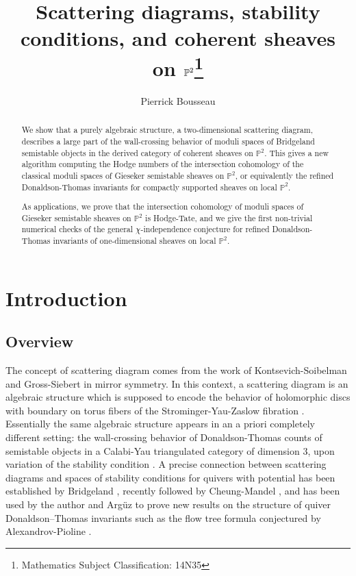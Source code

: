 \documentclass[12pt, a4paper]{amsart}
\title[Scattering diagrams, stability conditions, and coherent sheaves on 
$\PP^2$]{Scattering diagrams, stability conditions, and coherent sheaves on 
$\PP^2$\footnote{Mathematics Subject Classification: 14N35}}
\author{Pierrick Bousseau}
\date{}
\newcommand\PP{\mathbb P}
\begin{document}
\begin{abstract}
We show that a purely algebraic structure, a two-dimensional scattering diagram, describes a large part of the wall-crossing behavior of moduli spaces of Bridgeland semistable objects in the derived category of coherent sheaves on $\PP^2$. This gives a new algorithm computing the Hodge numbers of the intersection cohomology of the classical moduli spaces of Gieseker semistable sheaves
on $\PP^2$, or equivalently the refined Donaldson-Thomas invariants for compactly supported sheaves on local 
$\PP^2$.

As applications, we prove that the intersection cohomology of moduli spaces of Gieseker semistable sheaves on $\PP^2$ is Hodge-Tate, and we give the first non-trivial numerical checks of the general $\chi$-independence conjecture for refined Donaldson-Thomas invariants of one-dimensional sheaves on local $\PP^2$.
\end{abstract}



\maketitle

\setcounter{tocdepth}{1}
\setcounter{section}{-1}

\tableofcontents

\thispagestyle{empty}







\section{Introduction}

\subsection{Overview}

The concept of scattering diagram comes from the work of 
Kontsevich-Soibelman \cite{MR2181810}
and Gross-Siebert \cite{MR2846484} in mirror symmetry. In this context, a scattering diagram is an algebraic structure which is supposed to encode the behavior of holomorphic discs with boundary
on torus fibers of the Strominger-Yau-Zaslow fibration \cite{MR1429831}. Essentially the same algebraic structure appears in an a priori completely different setting: the wall-crossing behavior of Donaldson-Thomas counts of semistable objects in a Calabi-Yau triangulated category of dimension $3$, upon variation of the stability condition \cite{kontsevich2008stability, MR2951762, MR3330788}.
A precise connection between scattering diagrams and spaces of stability conditions
for quivers with potential has been established by Bridgeland \cite{MR3710055}, recently followed by Cheung-Mandel \cite{cheung2019donaldson}, and has been used by the author and Arg\"uz \cite{AB21} to prove new results on the structure of quiver Donaldson--Thomas invariants such as the flow tree formula conjectured by Alexandrov-Pioline \cite{AP19} .
\end{document}
